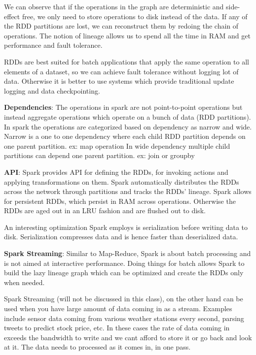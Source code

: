 \documentclass[twoside]{article}
\begin{document}
We can observe that if the operations in the graph are deterministic and side-effect free,  we only need to store operations to disk instead of the data. If any of the RDD partitions are lost, we can reconstruct them by redoing the chain of operations. The notion of lineage allows us to spend all the time in RAM and get performance and fault tolerance. 

RDDs are best suited for batch applications that apply the same operation to all elements of a dataset, so we can achieve fault tolerance without logging lot of data. Otherwise it is better to use systems which provide traditional update logging and data checkpointing. \newline


\textbf{Dependencies}: \newline
The operations in spark are not point-to-point operations but instead aggregate operations which operate on a bunch of data (RDD partitions). In spark the operations are categorized based on dependency as narrow and wide. Narrow is a one to one dependency where each child RDD partition depends on one parent partition. ex: map operation \newline 
In wide dependency multiple child partitions can depend one parent partition. ex: join or groupby \newline


\textbf{API}: \newline
Spark provides API for defining the RDDs, for invoking actions and applying transformations on them.  Spark automatically distributes the RDDs across the network through partitions and tracks the RDDs' lineage.
Spark allows for persistent RDDs, which persist in RAM across operations. Otherwise the RDDs are aged out in an LRU fashion and are flushed out to disk.

An interesting optimization Spark employs is serialization before writing data to disk. Serialization compresses data and is hence faster than deserialized data.\newline


\textbf{Spark Streaming}: \newline
Similar to Map-Reduce, Spark is about batch processing and is not aimed at interactive performance. Doing things for batch allows Spark to build the lazy lineage graph which can be optimized and create the RDDs only when needed. 

Spark Streaming (will not be discussed in this class), on the other hand can be used when you have large amount of  data coming in as a stream. Examples include sensor data coming from various weather stations every second, parsing tweets to predict stock price, etc. In these cases the rate of data coming in exceeds the bandwidth to write and we cant afford to store it or go back and look at it. The data needs to processed as it comes in, in one pass. 
\end{document}
